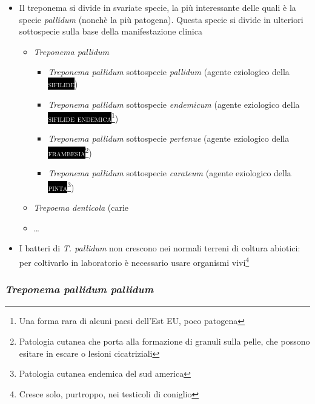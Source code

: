 \documentclass[italian,]{article}
\providecommand{\tightlist}{%
  \setlength{\itemsep}{0pt}\setlength{\parskip}{0pt}}
\newcommand{\pat}[1]{\colorbox{black}{\textcolor{white}{\textsc{#1}}}}
\begin{document}
\begin{itemize}
\tightlist
\item
  Il treponema si divide in svariate specie, la più interessante delle
  quali è la specie \emph{pallidum} (nonchè la più patogena). Questa
  specie si divide in ulteriori sottospecie sulla base della
  manifestazione clinica

  \begin{itemize}
  \tightlist
  \item
    \emph{Treponema pallidum}

    \begin{itemize}
    \tightlist
    \item
      \emph{Treponema pallidum} sottospecie \emph{pallidum} (agente
      eziologico della \pat{sifilide})
    \item
      \emph{Treponema pallidum} sottospecie \emph{endemicum} (agente
      eziologico della \pat{sifilide endemica}\footnote{Una forma rara
        di alcuni paesi dell'Est EU, poco patogena})
    \item
      \emph{Treponema pallidum} sottospecie \emph{pertenue} (agente
      eziologico della \pat{frambesia}\footnote{Patologia cutanea che
        porta alla formazione di granuli sulla pelle, che possono
        esitare in escare o lesioni cicatriziali})
    \item
      \emph{Treponema pallidum} sottospecie \emph{carateum} (agente
      eziologico della \pat{pinta}\footnote{Patologia cutanea endemica
        del sud america})
    \end{itemize}
  \item
    \emph{Trepoema denticola} (carie
  \item
    \ldots{}
  \end{itemize}
\item
  I batteri di \emph{T. pallidum} non crescono nei normali terreni di
  coltura abiotici: per coltivarlo in laboratorio è necessario usare
  organismi vivi\footnote{Cresce solo, purtroppo, nei testicoli di
    coniglio}
\end{itemize}

\hypertarget{treponema-pallidum-pallidum}{%
\subsubsection{\texorpdfstring{\emph{Treponema pallidum
pallidum}}{Treponema pallidum pallidum}}\label{treponema-pallidum-pallidum}}
\end{document}
